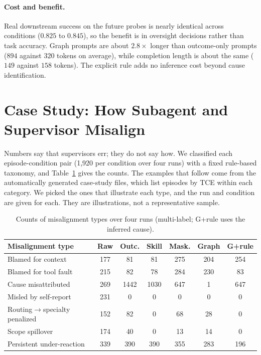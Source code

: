 \documentclass[letterpaper]{article}
\begin{document}
\paragraph{Cost and benefit.}
Real downstream success on the future probes is nearly identical across conditions ($0.825$ to $0.845$), so the benefit is in oversight decisions rather than task accuracy. Graph prompts are about $2.8\times$ longer than outcome-only prompts ($894$ against $320$ tokens on average), while completion length is about the same ($149$ against $158$ tokens). The explicit rule adds no inference cost beyond cause identification.

\section{Case Study: How Subagent and Supervisor Misalign}
Numbers say that supervisors err; they do not say how. We classified each episode-condition pair (1{,}920 per condition over four runs) with a fixed rule-based taxonomy, and Table~\ref{tab:tax} gives the counts. The examples that follow come from the automatically generated case-study files, which list episodes by TCE within each category. We picked the ones that illustrate each type, and the run and condition are given for each. They are illustrations, not a representative sample.

\begin{table}[t]
\centering\scriptsize
\setlength{\tabcolsep}{3pt}
\begin{tabular}{lcccccc}
\toprule
Misalignment type & Raw & Outc. & Skill & Mask. & Graph & G+rule\\
\midrule
Blamed for context & 177 & 81 & 81 & 275 & 204 & 254 \\
Blamed for tool fault & 215 & 82 & 78 & 284 & 230 & 83 \\
Cause misattributed & 269 & 1442 & 1030 & 647 & 1 & 647 \\
Misled by self-report & 231 & 0 & 0 & 0 & 0 & 0 \\
Routing$\to$specialty penalized & 152 & 82 & 0 & 68 & 28 & 0 \\
Scope spillover & 174 & 40 & 0 & 13 & 14 & 0 \\
Persistent under-reaction & 339 & 390 & 390 & 355 & 283 & 196 \\
\bottomrule
\end{tabular}
\caption{Counts of misalignment types over four runs (multi-label; G+rule uses the inferred cause).}
\label{tab:tax}
\end{table}
\end{document}
